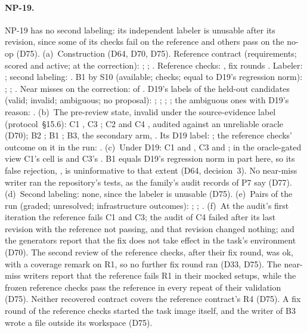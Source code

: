 \paragraph{NP-19.}
NP-19 has no second labeling: its independent labeler is unusable after its revision, since some of its checks fail on
the reference and others pass on the no-op (D75).
(a)~Construction (D64, D70, D75). Reference contract (requirements; scored and active; at the correction):
; ; . Reference checks:
, fix rounds . Labeler: ; second labeling:
. B1 by S10 (available; checks; equal to D19's regression norm): ;
; . Near misses on the correction:  of
. D19's labels of the held-out candidates (valid; invalid; ambiguous; no proposal):
; ; ; ; the ambiguous ones
with D19's reason: .
(b)~The pre-review state, invalid under the source-evidence label (protocol~\S15.6): C1 , C3
; C2  and C4 , audited against an unreliable oracle (D70); B2
; B1 ; B3, the secondary arm, . Its D19 label: ; the
reference checks' outcome on it in the run: .
(c)~Under D19: C1  and , C3  and ; in the oracle-gated
view C1's cell is  and C3's . B1 equals D19's regression norm in part here, so its false
rejection, , is uninformative to that extent (D64, decision~3). No near-miss writer ran the repository's
tests, as the family's audit records of P7 say (D77).
(d)~Second labeling: none, since the labeler is unusable (D75).
(e)~Pairs of the run (graded; unresolved; infrastructure outcomes): ; ;
.
(f)~At the audit's first iteration the reference fails C1 and C3; the audit of C4 failed after its last revision with
the reference not passing, and that revision changed nothing; and the generators report that the fix does not take
effect in the task's environment (D70). The second review of the reference checks, after their fix round, was ok, with a
coverage remark on R1, so no further fix round ran (D33, D75). The near-miss writers report that the reference fails R1
in their mocked setups, while the frozen reference checks pass the reference in every repeat of their validation (D75).
Neither recovered contract covers the reference contract's R4 (D75). A fix round of the reference checks started the
task image itself, and the writer of B3 wrote a file outside its workspace (D75).

